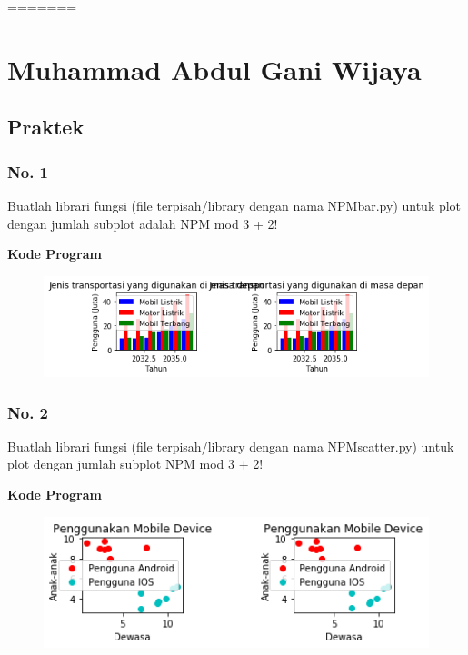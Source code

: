

=======
\section{Muhammad Abdul Gani Wijaya}
\subsection{Praktek}
\subsubsection{No. 1}
\hfill \break
Buatlah librari fungsi (file terpisah/library dengan nama NPMbar.py) untuk plot dengan jumlah subplot adalah NPM mod 3 + 2!

\hfill \break
\textbf{Kode Program}



\begin{figure}[H]
	\includegraphics[width=12cm]{figures/6/1174071/Praktek/barpraktek.png}
	\centering
\end{figure}

\subsubsection{No. 2}
\hfill \break
Buatlah librari fungsi (file terpisah/library dengan nama NPMscatter.py) untuk plot dengan jumlah subplot NPM mod 3 + 2!

\hfill \break
\textbf{Kode Program}



\begin{figure}[H]
	\includegraphics[width=12cm]{figures/6/1174071/Praktek/scatterpraktek.png}
	\centering
\end{figure}

